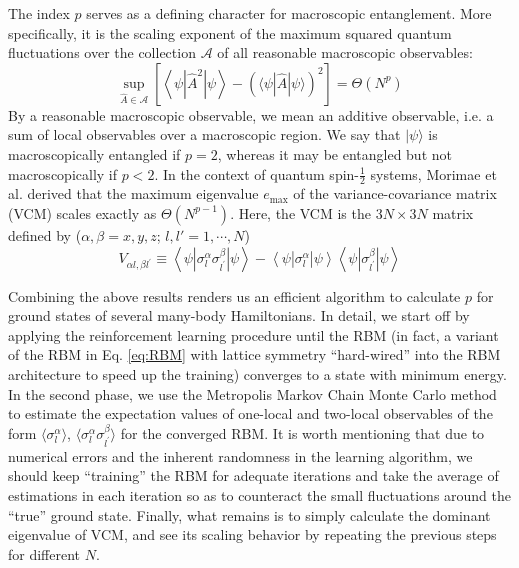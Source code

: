 \documentclass[aps,prl,reprint,superscriptaddress]{revtex4-2}
\begin{document}
The index $ p $ serves as a defining character for macroscopic entanglement. More specifically, it is the scaling exponent of the maximum squared quantum fluctuations over the collection $ \mathcal{A} $ of all reasonable macroscopic observables:
\begin{equation}
	\sup_{\hat{A} \in \mathcal{A}} \left[ \left\langle \psi \left| \hat{A}^{2} \right| \psi \right\rangle - (\langle \psi | \hat{A} | \psi \rangle)^{2} \right] = \Theta \left( N^{p} \right)
\end{equation}
By a reasonable macroscopic observable, we mean an additive observable, i.e. a sum of local observables over a macroscopic region. We say that $ | \psi \rangle $ is macroscopically entangled if $ p = 2 $, whereas it may be entangled but not macroscopically if $ p < 2 $. In the context of quantum spin-$ \frac{1}{2} $ systems, Morimae et al. \cite{Morimae2005Macroscopic} derived that the maximum eigenvalue $ e_{\max} $ of the variance-covariance matrix (VCM) scales exactly as $ \Theta \left( N^{p-1} \right) $. Here, the VCM is the $ 3N \times 3N $ matrix defined by ($ \alpha,\beta = x,y,z $; $ l,l' = 1,\cdots,N $)
\begin{equation}
	V_{\alpha l, \beta l^{\prime}} \equiv \left\langle \psi \left| \sigma_{l}^{\alpha} \sigma_{l^{\prime}}^{\beta} \right| \psi \right\rangle - \left\langle \psi \left| \sigma_{l}^{\alpha} \right| \psi \right\rangle \left\langle \psi\left| \sigma_{l^{\prime}}^{\beta} \right| \psi \right\rangle
\end{equation}

Combining the above results renders us an efficient algorithm to calculate $ p $ for ground states of several many-body Hamiltonians. In detail, we start off by applying the reinforcement learning procedure until the RBM (in fact, a variant of the RBM in Eq. \eqref{eq:RBM} with lattice symmetry ``hard-wired'' into the RBM architecture to speed up the training) converges to a state with minimum energy. In the second phase, we use the Metropolis Markov Chain Monte Carlo method to estimate the expectation values of one-local and two-local observables of the form $ \langle \sigma_l^{\alpha} \rangle $, $ \langle \sigma_{l}^{\alpha} \sigma_{l^{\prime}}^{\beta} \rangle $ for the converged RBM. It is worth mentioning that due to numerical errors and the inherent randomness in the learning algorithm, we should keep ``training'' the RBM for adequate iterations and take the average of estimations in each iteration so as to counteract the small fluctuations around the ``true'' ground state. Finally, what remains is to simply calculate the dominant eigenvalue of VCM, and see its scaling behavior by repeating the previous steps for different $ N $.
\end{document}
